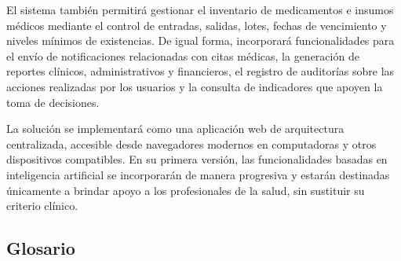 \documentclass[11pt,a4paper]{article}
\begin{document}
	El sistema también permitirá gestionar el inventario de medicamentos e insumos médicos mediante el control de entradas, salidas, lotes, fechas de vencimiento y niveles mínimos de existencias. De igual forma, incorporará funcionalidades para el envío de notificaciones relacionadas con citas médicas, la generación de reportes clínicos, administrativos y financieros, el registro de auditorías sobre las acciones realizadas por los usuarios y la consulta de indicadores que apoyen la toma de decisiones.
	
	La solución se implementará como una aplicación web de arquitectura centralizada, accesible desde navegadores modernos en computadoras y otros dispositivos compatibles. En su primera versión, las funcionalidades basadas en inteligencia artificial se incorporarán de manera progresiva y estarán destinadas únicamente a brindar apoyo a los profesionales de la salud, sin sustituir su criterio clínico.
	
	\subsection{ Glosario}
	
	\label{subsec:glosario}
	
\end{document}
